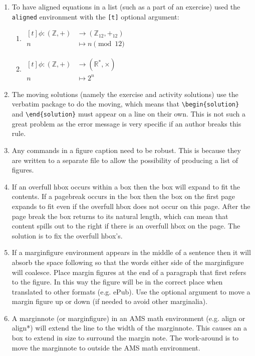 \documentclass[solutionsatend,twocolumnsolutions]{ouunit}
\begin{document}
\begin{enumerate}[1.]
\item
To have aligned equations in a list (such as a part of an exercise) used the \verb”aligned” environment with the \verb”[t]” optional argument:
\begin{enumerate}
\item \(\begin{aligned}[t]
\phi:(\mathbb{Z},+)&\longrightarrow (\mathbb{Z}_{12},+_{12})\\
  n&\longmapsto n\pmod{12}
  \end{aligned}\)
\item \(\begin{aligned}[t]
\phi:(\mathbb{Z},+)&\longrightarrow (\mathbb{R}^*,\times)\\
  n&\longmapsto 2^n
  \end{aligned}\)
\end{enumerate}
\item
The moving solutions (namely the exercise and activity solutions) use the verbatim package to do the moving, which means that \verb”\begin{solution}” and \verb”\end{solution}” must appear on a line on their own. This is not such a great problem as the error message is very specific if an author breaks this rule.
\item
Any commands in a figure caption need to be robust. This is because they are written to a separate file to allow the possibility of producing a list of figures.
\item
If an overfull hbox occurs within a box then the box will expand to fit the contents. If a pagebreak occurs in the box then the box on the first page expands to fit even if the overfull hbox does not occur on this page. After the page break the box returns to its natural length, which can mean that content spills out to the right if there is an overfull hbox on the page. The solution is to fix the overfull hbox's.
\item
If a marginfigure environment appears in the middle of a sentence then it will absorb the space following so that the words either side of the marginfigure will coalesce. Place margin figures at the end of a paragraph that first refers to the figure. In this way the figure will be in the correct place when translated to other formats (e.g. ePub). Use the optional argument to move a margin figure up or down (if needed to avoid other marginalia).
\item
A marginnote (or marginfigure) in an AMS math environment (e.g. align or align*) will extend the line to the width of the marginnote. This causes an a box to extend in size to surround the margin note. The work-around is to move the marginnote to outside the AMS math environment.

\end{enumerate}
\end{document}
